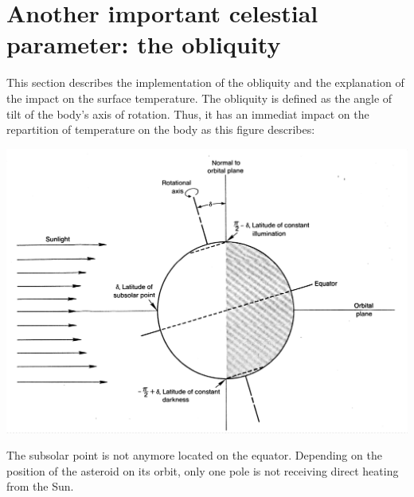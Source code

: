 \section{Another important celestial parameter: the obliquity}
\label{obliquity}

This section describes the implementation of the obliquity and the explanation of the impact on the surface temperature. The obliquity is defined as the angle of tilt of the body's axis of rotation. Thus, it has an immediat impact on the repartition of temperature on the body as this figure describes: 
\begin{center}
    \includegraphics[width=\linewidth]{rsc/obliquity.png}
\end{center}
The subsolar point is not anymore located on the equator. Depending on the position of the asteroid on its orbit, only one pole is not receiving direct heating from the Sun.

